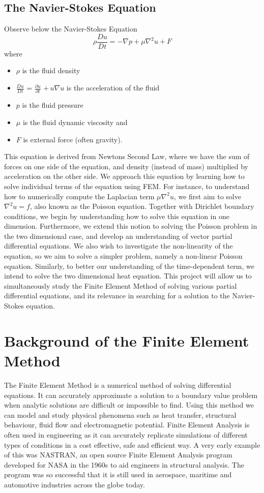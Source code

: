 \documentclass{article}
\begin{document}
\subsection{The Navier-Stokes Equation}
Observe below the Navier-Stokes Equation
$$\rho \frac{Du}{Dt} = - \nabla p + \mu \nabla^2u + F$$
where 
\begin{itemize}
\item $\rho$ is the fluid density 
\item {\Large$\frac{Du}{Dt} $} = {\Large$\frac{\partial u}{\partial t}$} $+\, u\nabla u$ is the acceleration of the fluid 
\item $p$ is the fluid pressure
\item $\mu$ is the fluid dynamic viscosity and 
\item $F$ is external force (often gravity).
\end{itemize}
This equation is derived from Newtons Second Law, where we have the sum of forces on one side of the equation, and density (instead of mass) multiplied by acceleration on the other side. We approach this equation by learning how to solve individual terms of the equation using FEM. For instance, to understand how to numerically compute the Laplacian term $\mu \nabla^2u$, we first aim to solve $\nabla^2u = f$, also known as the Poisson equation. Together with Dirichlet boundary conditions, we begin by understanding how to solve this equation in one dimension. Furthermore, we extend this notion to solving the Poisson problem in the two dimensional case, and develop an understanding of vector partial differential equations. We also wish to investigate the non-linearity of the equation, so we aim to solve a simpler problem, namely a non-linear Poisson equation. Similarly, to better our understanding of the time-dependent term, we intend to solve the two dimensional heat equation. This project will allow us to simultaneously study the Finite Element Method of solving various partial differential equations, and its relevance in searching for a solution to the Navier-Stokes equation. 

\section{Background of the Finite Element Method}
The Finite Element Method is a numerical method of solving differential equations. It can accurately approximate a solution to a boundary value problem when analytic solutions are difficult or impossible to find. Using this method we can model and study physical phenomena such as heat transfer, structural behaviour, fluid flow and electromagnetic potential. Finite Element Analysis is often used in engineering as it can accurately replicate simulations of different types of conditions in a cost effective, safe and efficient way. A very early example of this was NASTRAN, an open source Finite Element Analysis program developed for NASA in the 1960s to aid engineers in structural analysis. The program was so successful that it is still used in aerospace, maritime and automotive industries across the globe today. 
\end{document}
